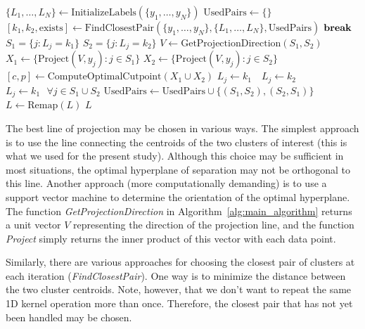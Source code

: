 \documentclass[10pt]{article}
\begin{document}
\begin{algorithm}
\caption{}
\begin{algorithmic}
\State $\{L_1,\dots,L_N\} \gets \text{InitializeLabels} (\{y_1,\dots,y_N\})$
\State $\text{UsedPairs} \gets \{\}$
\Loop
	\State $[k_1,k_2,\text{exists}] \gets \text{FindClosestPair}(\{y_1,\dots,y_N\},\{L_1,\dots,L_N\},\text{UsedPairs})$
	 
		\State $\text{\textbf{break}}$ 
	\EndIf
	\State $S_1=\{j: L_j=k_1\}$
	\State $S_2=\{j: L_j=k_2\}$
	\State $V \gets \text{GetProjectionDirection}(S_1,S_2)$
	\State $X_1 \gets \{\text{Project}(V,y_j): j\in S_1\}$
	\State $X_2 \gets \{\text{Project}(V,y_j): j\in S_2\}$
	\State $[c,p] \gets \text{ComputeOptimalCutpoint}(X_1\cup X_2)$
	 
				$L_j \gets k_1$
			\Else
				$\text{ }L_j \gets k_2$
			\EndIf
		\EndFor
	\Else {}
		\State $L_j\gets k_1 \text{ }\forall j\in S_1\cup S_2$ 
	\EndIf
	\State $\text{UsedPairs}\gets\text{UsedPairs}\cup\{(S_1,S_2),(S_2,S_1)\}$
        \EndLoop
\State{}
\State $L\gets \text{Remap}(L)$
\State \Return $L$
\EndFunction
\end{algorithmic}
\label{alg:main_algorithm}
\end{algorithm}

The best line of projection may be chosen in various ways. The simplest approach is to use the line connecting the centroids of the two clusters of interest (this is what we used for the present study). Although this choice may be sufficient in most situations, the optimal hyperplane of separation may not be orthogonal to this line. Another approach (more computationally demanding) is to use a support vector machine to determine the orientation of the optimal hyperplane. The function \emph{GetProjectionDirection} in Algorithm~\ref{alg:main_algorithm} returns a unit vector $V$ representing the direction of the projection line, and the function \emph{Project} simply returns the inner product of this vector with each data point.

Similarly, there are various approaches for choosing the closest pair of clusters at each iteration (\emph{FindClosestPair}). One way is to minimize the distance between the two cluster centroids. Note, however, that we don't want to repeat the same 1D kernel operation more than once. Therefore, the closest pair that has not yet been handled may be chosen.
\end{document}
